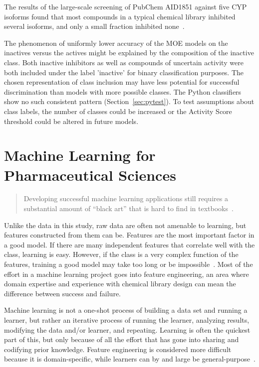 The results of the large-scale screening of PubChem AID1851 against five CYP isoforms found that most compounds in a typical chemical library inhibited several isoforms, and only a small fraction inhibited none~\cite{Veith2009}.

The phenomenon of uniformly lower accuracy of the MOE models on the inactives versus the actives might be explained by the composition of the inactive class. Both inactive inhibitors as well as compounds of uncertain activity were both included under the label 'inactive' for binary classification purposes. The chosen representation of class inclusion may have less potential for successful discrimination than models with more possible classes. The Python classifiers show no such consistent pattern (Section~\ref{sec:pytest}). To test assumptions about class labels, the number of classes could be increased or the Activity Score threshold could be altered in future models.


\section{Machine Learning for Pharmaceutical Sciences}
\begin{quote}
Developing successful machine learning applications still requires a substantial amount of “black art” that is hard to find in textbooks~\cite{Domingos2012}.
\end{quote}

Unlike the data in this study, raw data are often not amenable to learning, but features constructed from them can be. Features are the most important factor in a good model. If there are many independent features that correlate well with the class, learning is easy. However, if the class is a very complex function of the features, training a good model may take too long or be impossible~\cite{Domingos2012}. Most of the effort in a machine learning project goes into feature engineering, an area where domain expertise and experience with chemical library design can mean the difference between success and failure.

Machine learning is not a one-shot process of building a data set and running a learner, but rather an iterative process of running the learner, analyzing results, modifying the data and/or learner, and repeating. Learning is often the quickest part of this, but only because of all the effort that has gone into sharing and codifying prior knowledge. Feature engineering is considered more difficult because it is domain-specific, while learners can by and large be general-purpose~\cite{Domingos2012}.

